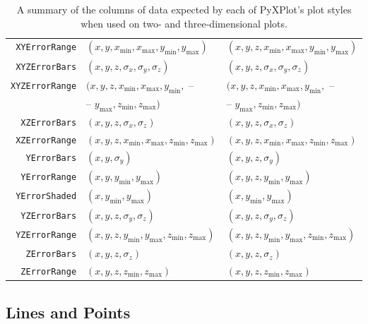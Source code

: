 \begin{table}
\begin{tabular}{|rll|}
{\tt XYErrorRange} & $(x,y,x_\mathrm{min},x_\mathrm{max},y_\mathrm{min},y_\mathrm{max})$ & $(x,y,z,x_\mathrm{min},x_\mathrm{max},y_\mathrm{min},y_\mathrm{max})$ \\
{\tt XYZErrorBars} & $(x,y,z,\sigma_x,\sigma_y,\sigma_z)$ & $(x,y,z,\sigma_x,\sigma_y,\sigma_z)$ \\
{\tt XYZErrorRange} & $(x,y,z,x_\mathrm{min},x_\mathrm{max},y_\mathrm{min},$ -- & $(x,y,z,x_\mathrm{min},x_\mathrm{max},y_\mathrm{min},$ -- \\
                    & -- $y_\mathrm{max},z_\mathrm{min},z_\mathrm{max})$ & -- $y_\mathrm{max},z_\mathrm{min},z_\mathrm{max})$ \\
{\tt XZErrorBars} & $(x,y,z,\sigma_x,\sigma_z)$ & $(x,y,z,\sigma_x,\sigma_z)$ \\
{\tt XZErrorRange} & $(x,y,z,x_\mathrm{min},x_\mathrm{max},z_\mathrm{min},z_\mathrm{max})$ & $(x,y,z,x_\mathrm{min},x_\mathrm{max},z_\mathrm{min},z_\mathrm{max})$ \\
{\tt YErrorBars} & $(x,y,\sigma_y)$ & $(x,y,z,\sigma_y)$ \\
{\tt YErrorRange} & $(x,y,y_\mathrm{min},y_\mathrm{max})$ & $(x,y,z,y_\mathrm{min},y_\mathrm{max})$ \\
{\tt YErrorShaded} & $(x,y_\mathrm{min},y_\mathrm{max})$ & $(x,y_\mathrm{min},y_\mathrm{max})$ \\
{\tt YZErrorBars} & $(x,y,z,\sigma_y,\sigma_z)$ & $(x,y,z,\sigma_y,\sigma_z)$ \\
{\tt YZErrorRange} & $(x,y,z,y_\mathrm{min},y_\mathrm{max},z_\mathrm{min},z_\mathrm{max})$ & $(x,y,z,y_\mathrm{min},y_\mathrm{max},z_\mathrm{min},z_\mathrm{max})$ \\
{\tt ZErrorBars} & $(x,y,z,\sigma_z)$ & $(x,y,z,\sigma_z)$ \\
{\tt ZErrorRange} & $(x,y,z,z_\mathrm{min},z_\mathrm{max})$ & $(x,y,z,z_\mathrm{min},z_\mathrm{max})$ \\
\hline
\end{tabular}
\caption{A summary of the columns of data expected by each of PyXPlot's plot styles when used on two- and three-dimensional plots.}
\label{tab:plot_style_columns}
\end{table}

\subsection{Lines and Points}

